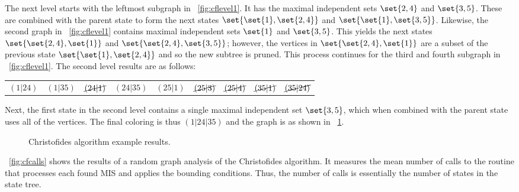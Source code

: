 The next level starts with the leftmost subgraph in \figurename~\ref{fig:cflevel1}.  It has the maximal independent
sets \(\set{2,4}\) and \(\set{3,5}\).  These are combined with the parent state to form the next states
\(\set{\set{1},\set{2,4}}\) and \(\set{\set{1},\set{3,5}}\).  Likewise, the second graph in
\figurename~\ref{fig:cflevel1} contains maximal independent sets \(\set{1}\) and \(\set{3,5}\).  This yields the
next states \(\set{\set{2,4},\set{1}}\) and \(\set{\set{2,4},\set{3,5}}\); however, the vertices in
\(\set{\set{2,4},\set{1}}\) are a subset of the previous state \(\set{\set{1},\set{2,4}}\) and so the new subtree
is pruned.  This process continues for the third and fourth subgraph in \figurename~\ref{fig:cflevel1}.  The second
level results are as follows:

\begin{tabular}{ccccccccc}
  \((1|24)\) & \((1|35)\) & \(\cancel{(24|1)}\) & \((24|35)\) & \((25|1)\) & \(\cancel{(25|3)}\) &
  \(\cancel{(25|4)}\) & \(\cancel{(35|1)}\) & \(\cancel{(35|24)}\)
\end{tabular}

Next, the first state in the second level contains a single maximal independent set \(\set{3,5}\), which when
combined with the parent state uses all of the vertices.  The final coloring is thus \((1|24|35)\) and the graph is
 as shown in \figurename~\ref{fig:cfresults}.

\begin{figure}[H]
  \centering
  \caption{Christofides algorithm example results.}
  \label{fig:cfresults}
\end{figure}

\figurename~\ref{fig:cfcalls} shows the results of a random graph analysis of the Christofides algorithm.  It
measures the mean number of calls to the routine that processes each found MIS and applies the bounding conditions.
Thus, the number of calls is essentially the number of states in the state tree.

